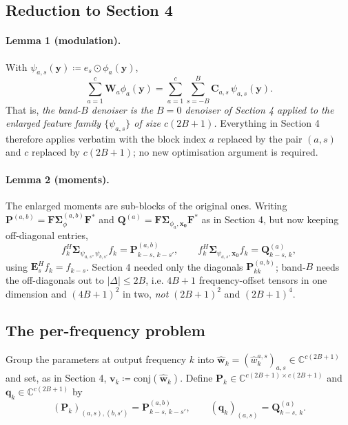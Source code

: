 \subsection{Reduction to Section 4}

\paragraph{Lemma 1 (modulation).} With $\psi_{a,s}(\boldsymbol{y})\coloneqq e_{s}\odot\phi_{a}(\boldsymbol{y})$,
\[
\sum^{c}_{a=1}\boldsymbol{W}_{a}\phi_{a}(\boldsymbol{y})
=\sum^{c}_{a=1}\sum^{B}_{s=-B}\boldsymbol{C}_{a,s}\,\psi_{a,s}(\boldsymbol{y}).
\]
That is, \emph{the band-$B$ denoiser is the $B=0$ denoiser of Section 4 applied to the
enlarged feature family $\{\psi_{a,s}\}$ of size $c(2B+1)$.} Everything in Section 4
therefore applies verbatim with the block index $a$ replaced by the pair $(a,s)$ and
$c$ replaced by $c(2B+1)$; no new optimisation argument is required.

\paragraph{Lemma 2 (moments).} The enlarged moments are sub-blocks of the original
ones. Writing $\boldsymbol{P}^{(a,b)}=\boldsymbol{F}\boldsymbol{\Sigma}^{(a,b)}_{\phi}\boldsymbol{F}^{*}$
and $\boldsymbol{Q}^{(a)}=\boldsymbol{F}\boldsymbol{\Sigma}_{\phi_{a},\boldsymbol{x_{0}}}\boldsymbol{F}^{*}$
as in Section 4, but now keeping off-diagonal entries,
\[
f^{H}_{k}\boldsymbol{\Sigma}_{\psi_{a,s},\psi_{b,s'}}f_{k}
=\boldsymbol{P}^{(a,b)}_{k-s,\,k-s'},
\qquad
f^{H}_{k}\boldsymbol{\Sigma}_{\psi_{a,s},\boldsymbol{x_{0}}}f_{k}
=\boldsymbol{Q}^{(a)}_{k-s,\,k},
\]
using $\boldsymbol{E}^{H}_{s}f_{k}=f_{k-s}$. Section 4 needed only the diagonals
$\boldsymbol{P}^{(a,b)}_{kk}$; band-$B$ needs the off-diagonals out to
$|\Delta|\le 2B$, i.e. $4B+1$ frequency-offset tensors in one dimension and
$(4B+1)^{2}$ in two, \emph{not} $(2B+1)^{2}$ and $(2B+1)^{4}$.

\subsection{The per-frequency problem}

Group the parameters at output frequency $k$ into
$\hat{\mathbf{w}}_{k}=(\hat{w}^{a,s}_{k})_{a,s}\in\mathbb{C}^{c(2B+1)}$ and set, as in
Section 4, $\boldsymbol{v}_{k}\coloneqq\text{conj}(\hat{\mathbf{w}}_{k})$. Define
$\mathbf{P}_{k}\in\mathbb{C}^{c(2B+1)\times c(2B+1)}$ and $\mathbf{q}_{k}\in\mathbb{C}^{c(2B+1)}$
by
\[
(\mathbf{P}_{k})_{(a,s),(b,s')}=\boldsymbol{P}^{(a,b)}_{k-s,\,k-s'},
\qquad
(\mathbf{q}_{k})_{(a,s)}=\boldsymbol{Q}^{(a)}_{k-s,\,k}.
\]

